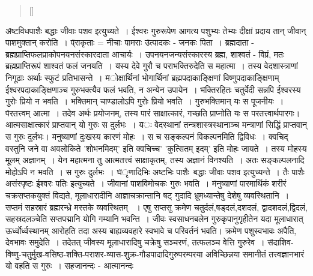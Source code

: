 \begin{verse}[\versewidth]
\end{verse}
{\fontsize{14}{16}\selectfont \v  अष्टविधपाशैः बद्धाः जीवाः पशव इत्युच्यते~। ईश्वरः गुरुरूपेण आगत्य पशुभ्यः तेभ्यः दीक्षां प्रदाय तान् जीवान्  पाशमुक्तान् करोति~। }
{\fontsize{14}{16}\selectfont \v प्राकृताः = नीचाः पामराः}
{\fontsize{14}{16}\selectfont \v  उत्पादकः - जनकः पिता~। ब्रह्मदाता - ब्रह्मप्राप्तिफलप्राकोपनयनसंस्कारदाता  आचार्यः~। उपनयनजन्यसंस्कारस्य ब्रह्म, शाश्वतं - विप्रं, मतः ब्रह्मप्राप्तिरूपं शाश्वतं फलं जनयति~।}
{\fontsize{14}{16}\selectfont \v  यस्य देवे गुरौ च पराभक्तिरुदेति स महात्मा~। तस्य वेदशास्त्राणां निगूढाः अर्थाः स्फुटं प्रतिभासन्ते~।}
{\fontsize{14}{16}\selectfont \v  मोक्षार्थिनां भोगार्थिनां ब्रह्मपदाकाङ्क्षिणां विष्णुपदाकाङ्क्षिणाम् ईश्वरपदाकाङ्क्षिणाञ्च गुरुभक्त्यैव फलं भवति,  न अन्येन उपायेन~।}
{\fontsize{14}{16}\selectfont \v  भक्तिरहितः चतुर्वेदी सन्नपि ईश्वरस्य गुरोः प्रियो न भवति~। भक्तिमान् चाण्डालोऽपि गुरोः प्रियो भवति~। गुरुभक्तिमान् यः स पूजनीयः~।  }
{\fontsize{14}{16}\selectfont \v  परतत्त्वम् आत्मा~। तदेव अर्थः प्रयोजनम्, तस्य पारं साक्षात्कारं, गच्छति प्राप्नोति यः स परतत्त्वार्थपारगः। आत्मसाक्षात्कारं प्राप्तवान् यो गुरुः स दुर्लभः~।}
{\fontsize{14}{16}\selectfont \v यः वेदस्थानां तन्त्रशास्त्रस्थानाञ्च मन्त्राणां सिद्धिं प्राप्तवान् स गुरुः दुर्लभः।}
{\fontsize{14}{16}\selectfont \v  मनुष्याणां दुःखस्य कारणं मोहः~। स च सङ्कल्पनं विकल्पनमिति द्विविधः~। क्वचिद् वस्तुनि जने वा अवलोकिते 'शोभनमिदम्' इति क्वचिच्च' 'कुत्सितम् इदम्' इति मोहः जायते~। तस्य मोहस्य मूलम् अज्ञानम्~। येन महात्मना तु आत्मतत्त्वं साक्षाकृतम्, तस्य अज्ञानं विनश्यति~। अतः सङ्कल्पलनादि मोहोऽपि न भवति~। स गुरुः दुर्लभः~।}
{\fontsize{14}{16}\selectfont \v घृणादिभिः अष्टभिः पाशैः\footB\  बद्धाः जीवाः पशव इत्युच्यन्ते~। तैः पाशैः असंस्पृष्टः ईश्वरः पतिः इत्युच्यते~। जीवानां पाशविमोचकः गुरुः भवति~।}
{\fontsize{14}{16}\selectfont \v  मनुष्याणां पारमार्थिकं शरीरं चक्रसप्तकयुक्तं विद्यते, मूलाधारादीनि आज्ञाचक्रान्तानि षट् गुदादि भ्रूमध्यान्तेषु देशेषु व्यवस्थितानि~। सप्तमं  सहस्रारं ब्रह्मरन्ध्रे मस्तके व्यवस्थितम् ~। एषु सप्तसु क्रमेण चतुर्दलं,षड्दलं,दशदलं, द्वादशदलं,द्विदलं, सहस्रदलञ्चेति सप्तपद्मानि योगि गम्यानि भवन्ति~। जीवः स्वसाधनबलेन गुरुकृपानुगृहीतेन यदा मूलाधारात् ऊर्ध्वोर्ध्वस्थानम् आरोहति तदा अस्य बाह्यव्यवहारे स्वभावे च परिवर्तनं भवति। क्रमेण पशुस्वभावः अपैति, देवभावः समुदेति~। तदेतत् जीवस्य मूलाधारादिषु चक्रेषु सञ्चरणं, तत्फलञ्च वेत्ति गुरुरेव~।}
{\fontsize{14}{16}\selectfont \v  सदाशिव-विष्णु-चतुर्मुख-वसिष्ठ-शक्ति-पराशर-व्यास-शुक्र-गौडपादादिगुरुपरम्परया अविच्छिन्नया समानीतं तत्त्वज्ञानभारं यो वहति स गुरुः~।}
{\fontsize{14}{16}\selectfont \v  सहजानन्दः - आत्मानन्दः}

